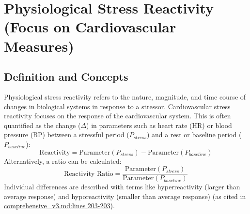 \documentclass[11pt, a4paper]{report}
\newcommand{\mdcite}[3]{\href{run:./sources/#1}{\url{#1}:lines #2-#3}} %
\begin{document}
\section{Physiological Stress Reactivity (Focus on Cardiovascular Measures)}
\label{sec:physio_stress_reactivity} %

\subsection{Definition and Concepts}
\label{subsec:definition_stress_reactivity} %
Physiological stress reactivity refers to the nature, magnitude, and time course of changes in biological systems in response to a stressor. Cardiovascular stress reactivity focuses on the response of the cardiovascular system. This is often quantified as the change ($\Delta$) in parameters such as heart rate (HR) or blood pressure (BP) between a stressful period ($P_{stress}$) and a rest or baseline period ($P_{baseline}$):
\begin{equation}
    \text{Reactivity} = \text{Parameter}(P_{stress}) - \text{Parameter}(P_{baseline})
    \label{eq:reactivity_subtractive_en} %
\end{equation}
Alternatively, a ratio can be calculated:
\begin{equation}
    \text{Reactivity Ratio} = \frac{\text{Parameter}(P_{stress})}{\text{Parameter}(P_{baseline})}
    \label{eq:reactivity_ratio_en} %
\end{equation}
Individual differences are described with terms like hyperreactivity (larger than average response) and hyporeactivity (smaller than average response) \cite{KrantzManuck1984} (as cited in \mdcite{comprehensive_v3.md}{203}{203}).
\end{document}

